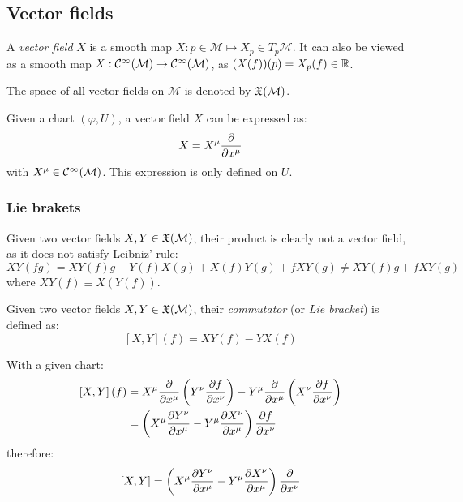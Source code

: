 \subsection{Vector fields}

\begin{definition}
  A \textit{vector field} $ X $ is a smooth map $ X : p \in \mathcal{M} \mapsto X_p \in T_p\mathcal{M} $. It can also be viewed as a smooth map $ X : \mathcal{C}^{\infty}(\mathcal{M}) \rightarrow \mathcal{C}^{\infty}(\mathcal{M}) $, as $ (X(f))(p) = X_p(f) \in \mathbb{R} $.
\end{definition}

\begin{definition}
  The space of all vector fields on $ \mathcal{M} $ is denoted by $ \mathfrak{X}(\mathcal{M}) $.
\end{definition}

Given a chart $ (\varphi,U) $, a vector field $ X $ can be expressed as:
\begin{equation}
  X = X^{\mu} \frac{\partial}{\partial x^{\mu}}
  \label{eq:2.6}
\end{equation}
with $ X^{\mu} \in \mathcal{C}^{\infty}(\mathcal{M}) $. This expression is only defined on $ U $.

\subsubsection{Lie brakets}

Given two vector fields $ X,Y \in\mathfrak{X}(\mathcal{M}) $, their product is clearly not a vector field, as it does not satisfy Leibniz' rule:
\begin{equation*}
  XY(fg) = XY(f) g + Y(f) X(g) + X(f) Y(g) + f XY(g) \neq XY(f) g + f XY(g)
\end{equation*}
where $ XY(f) \equiv X(Y(f)) $.

\begin{definition}
  Given two vector fields $ X,Y \in\mathfrak{X}(\mathcal{M}) $, their \textit{commutator} (or \textit{Lie bracket}) is defined as:
  \begin{equation}
    \left[ X,Y \right](f) = XY(f) - YX(f)
    \label{eq:2.7}
  \end{equation}
\end{definition}

With a given chart:
\begin{equation*}
  \begin{split}
    \left[ X,Y \right](f)
    &= X^{\mu} \frac{\partial}{\partial x^{\mu}} \left( Y^{\nu} \frac{\partial f}{\partial x^{\nu}} \right) - Y^{\mu} \frac{\partial}{\partial x^{\mu}} \left( X^{\nu} \frac{\partial f}{\partial x^{\nu}} \right)\\
    &= \left( X^{\mu} \frac{\partial Y^{\nu}}{\partial x^{\mu}} - Y^{\mu} \frac{\partial X^{\nu}}{\partial x^{\mu}} \right) \frac{\partial f}{\partial x^{\nu}}
  \end{split}
\end{equation*}
therefore:
\begin{equation}
  \left[ X,Y \right] = \left( X^{\mu} \frac{\partial Y^{\nu}}{\partial x^{\mu}} - Y^{\mu} \frac{\partial X^{\nu}}{\partial x^{\mu}} \right) \frac{\partial}{\partial x^{\nu}}
  \label{eq:2.8}
\end{equation}

